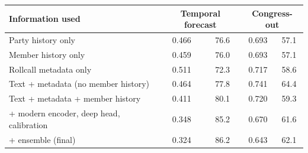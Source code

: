 \begin{tabular}{lcccc}
\toprule
Information used & \multicolumn{2}{c}{Temporal forecast} & \multicolumn{2}{c}{Congress-out} \\
\midrule
Party history only & 0.466 & 76.6 & 0.693 & 57.1 \\
Member history only & 0.459 & 76.0 & 0.693 & 57.1 \\
Rollcall metadata only & 0.511 & 72.3 & 0.717 & 58.6 \\
Text + metadata (no member history) & 0.464 & 77.8 & 0.741 & 64.4 \\
Text + metadata + member history & 0.411 & 80.1 & 0.720 & 59.3 \\
+ modern encoder, deep head, calibration & 0.348 & 85.2 & 0.670 & 61.6 \\
+ ensemble (final) & 0.324 & 86.2 & 0.643 & 62.1 \\
\bottomrule
\end{tabular}
